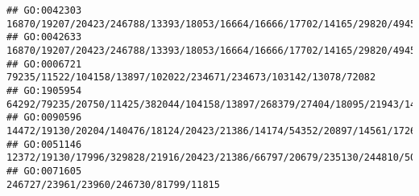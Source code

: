 \documentclass[
]{article}
\begin{document}
\begin{verbatim}
## GO:0042303                                                                                                                                                                                                                                                                                                                              16870/19207/20423/246788/13393/18053/16664/16666/17702/14165/29820/494504/14419
## GO:0042633                                                                                                                                                                                                                                                                                                                              16870/19207/20423/246788/13393/18053/16664/16666/17702/14165/29820/494504/14419
## GO:0006721                                                                                                                                                                                                                                                                                                                                             79235/11522/104158/13897/102022/234671/234673/103142/13078/72082
## GO:1905954                                                                                                                                                                                                                                                                                                                                   64292/79235/20750/11425/382044/104158/13897/268379/27404/18095/21943/14419
## GO:0090596                                                                                                                                                                                                                                                                     14472/19130/20204/140476/18124/20423/21386/14174/54352/20897/14561/17268/216616/16663/237979/20666/20474/14165/218772/21380/224796/17986
## GO:0051146                                                                                                                                                                                                                                                              12372/19130/17996/329828/21916/20423/21386/66797/20679/235130/244810/50876/109272/17268/18858/20307/14422/20474/65256/218772/18092/21380/225288
## GO:0071605                                                                                                                                                                                                                                                                                                                                                                        246727/23961/23960/246730/81799/11815

\end{verbatim}
\end{document}
